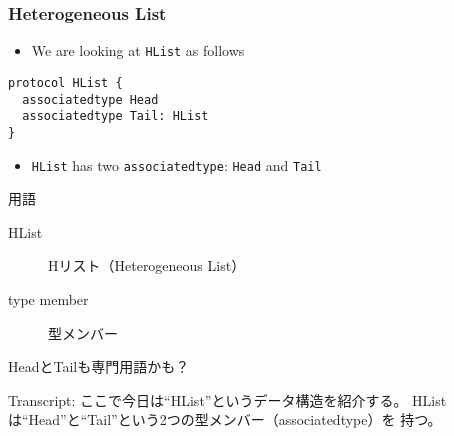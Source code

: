 \begin{frame}[fragile]
  \frametitle{Heterogeneous List}

  \begin{itemize}
    \item We are looking at \lstinline|HList| as follows
  \end{itemize}

\begin{lstlisting}[style=swift]
protocol HList {
  associatedtype Head
  associatedtype Tail: HList
}
\end{lstlisting}

  \pause
  \begin{itemize}
    \item<+-> \lstinline|HList| has two \lstinline|associatedtype|: \lstinline|Head| and \lstinline|Tail|
  \end{itemize}

  \begin{notes}
    \item 用語
    \begin{description}
      \item[HList] Hリスト（Heterogeneous List）
      \item[type member] 型メンバー
    \end{description}
 
    \item HeadとTailも専門用語かも？

    \item Transcript:
    ここで今日は``HList''というデータ構造を紹介する。
    HListは``Head''と``Tail''という2つの型メンバー（associatedtype）を
    持つ。
  \end{notes}
\end{frame}

